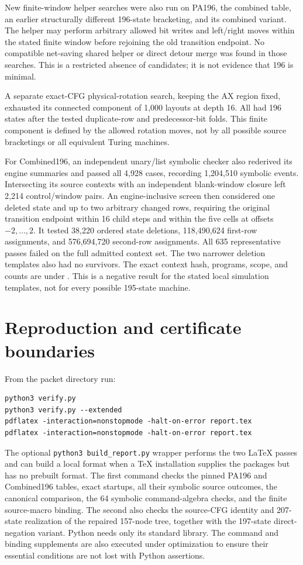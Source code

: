 \documentclass[11pt,a4paper]{article}
\begin{document}
New finite-window helper searches were also run on PA196, the combined
table, an earlier structurally different 196-state bracketing, and its
combined variant. The helper may perform arbitrary allowed bit writes and
left/right moves within the stated finite window before rejoining the
old transition endpoint. No compatible net-saving shared helper or direct
detour merge was found in those searches. This is a restricted absence of
candidates; it is not evidence that 196 is minimal.

A separate exact-CFG physical-rotation search, keeping the AX region fixed,
exhausted its connected component of 1,000 layouts at depth 16. All had
196 states after the tested duplicate-row and predecessor-bit folds.
This finite component is defined by the allowed rotation moves, not by
all possible source bracketings or all equivalent Turing machines.

For Combined196, an independent unary/list symbolic checker also rederived
its engine summaries and passed all 4,928 cases, recording 1,204,510
symbolic events. Intersecting its source contexts with an independent
blank-window closure left 2,214 control/window pairs. An engine-inclusive
screen then considered one deleted state and up to two arbitrary changed
rows, requiring the original transition endpoint within 16 child steps
and within the five cells at offsets $-2,\ldots,2$. It tested 38,220 ordered
state deletions, 118,490,624 first-row assignments, and 576,694,720
second-row assignments. All 635 representative passes failed on the full
admitted context set. The two narrower deletion templates also had no
survivors. The exact context hash, programs, scope, and counts are under
. This is a negative result for the stated
local simulation templates, not for every possible 195-state machine.

\section{Reproduction and certificate boundaries}
From the packet directory run:
\begin{lstlisting}
python3 verify.py
python3 verify.py --extended
pdflatex -interaction=nonstopmode -halt-on-error report.tex
pdflatex -interaction=nonstopmode -halt-on-error report.tex
\end{lstlisting}
The optional \texttt{python3 build\_report.py} wrapper performs the two
LaTeX passes and can build a local format when a TeX installation supplies
the packages but has no prebuilt format.
The first command checks the pinned PA196 and Combined196 tables, exact
startups, all their symbolic source outcomes, the canonical comparison,
the 64 symbolic command-algebra checks, and the finite source-macro binding.
The second also checks the source-CFG identity and 207-state realization
of the repaired 157-node tree, together with the 197-state direct-negation
variant. Python needs only its standard library.
The command and binding supplements are also executed under optimization
to ensure their essential conditions are not lost with Python assertions.
\end{document}
